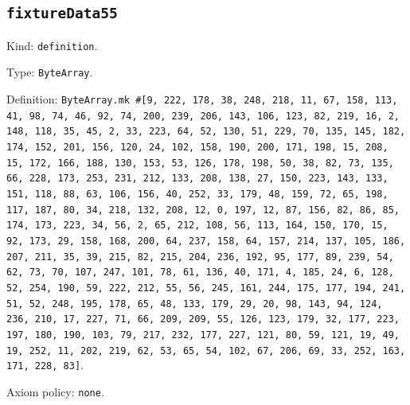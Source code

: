 \documentclass[11pt]{article}
\begin{document}
\subsection*{\texttt{fixtureData55}}
\noindent Kind: \texttt{definition}.\par
\noindent Type: \texttt{ByteArray}.\par
\noindent Definition: \texttt{ByteArray.mk \#[9, 222, 178, 38, 248, 218, 11, 67, 158, 113, 41, 98, 74, 46, 92, 74, 200, 239, 206, 143, 106, 123, 82, 219, 16, 2, 148, 118, 35, 45, 2, 33, 223, 64, 52, 130, 51, 229, 70, 135, 145, 182, 174, 152, 201, 156, 120, 24, 102, 158, 190, 200, 171, 198, 15, 208, 15, 172, 166, 188, 130, 153, 53, 126, 178, 198, 50, 38, 82, 73, 135, 66, 228, 173, 253, 231, 212, 133, 208, 138, 27, 150, 223, 143, 133, 151, 118, 88, 63, 106, 156, 40, 252, 33, 179, 48, 159, 72, 65, 198, 117, 187, 80, 34, 218, 132, 208, 12, 0, 197, 12, 87, 156, 82, 86, 85, 174, 173, 223, 34, 56, 2, 65, 212, 108, 56, 113, 164, 150, 170, 15, 92, 173, 29, 158, 168, 200, 64, 237, 158, 64, 157, 214, 137, 105, 186, 207, 211, 35, 39, 215, 82, 215, 204, 236, 192, 95, 177, 89, 239, 54, 62, 73, 70, 107, 247, 101, 78, 61, 136, 40, 171, 4, 185, 24, 6, 128, 52, 254, 190, 59, 222, 212, 55, 56, 245, 161, 244, 175, 177, 194, 241, 51, 52, 248, 195, 178, 65, 48, 133, 179, 29, 20, 98, 143, 94, 124, 236, 210, 17, 227, 71, 66, 209, 209, 55, 126, 123, 179, 32, 177, 223, 197, 180, 190, 103, 79, 217, 232, 177, 227, 121, 80, 59, 121, 19, 49, 19, 252, 11, 202, 219, 62, 53, 65, 54, 102, 67, 206, 69, 33, 252, 163, 171, 228, 83]}.\par
\noindent Axiom policy: \texttt{none}.\par
\end{document}
